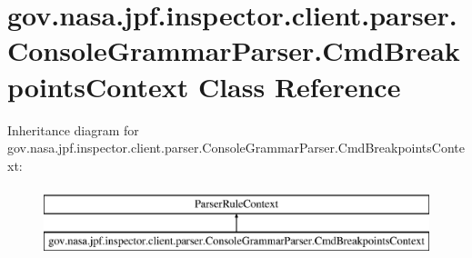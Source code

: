 \hypertarget{classgov_1_1nasa_1_1jpf_1_1inspector_1_1client_1_1parser_1_1_console_grammar_parser_1_1_cmd_breakpoints_context}{}\section{gov.\+nasa.\+jpf.\+inspector.\+client.\+parser.\+Console\+Grammar\+Parser.\+Cmd\+Breakpoints\+Context Class Reference}
\label{classgov_1_1nasa_1_1jpf_1_1inspector_1_1client_1_1parser_1_1_console_grammar_parser_1_1_cmd_breakpoints_context}
Inheritance diagram for gov.\+nasa.\+jpf.\+inspector.\+client.\+parser.\+Console\+Grammar\+Parser.\+Cmd\+Breakpoints\+Context\+:\begin{figure}[H]
\begin{center}
\leavevmode
\includegraphics[height=2.000000cm]{classgov_1_1nasa_1_1jpf_1_1inspector_1_1client_1_1parser_1_1_console_grammar_parser_1_1_cmd_breakpoints_context}
\end{center}
\end{figure}

